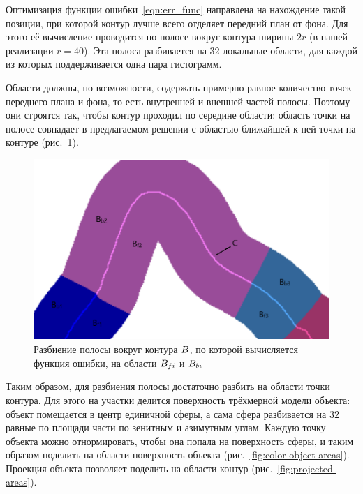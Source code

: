 Оптимизация функции ошибки~\ref{eqn:err_func} направлена на нахождение такой
позиции, при которой контур лучше всего отделяет передний план от фона.
Для этого её вычисление проводится по полосе вокруг контура ширины $2r$ (в нашей
реализации $r = 40$).
Эта полоса разбивается на $32$ локальные области, для каждой из
которых поддерживается одна пара гистограмм.

Области должны, по возможности, содержать примерно равное количество точек
переднего плана и фона, то есть внутренней и внешней частей полосы.
Поэтому они строятся так, чтобы контур проходил по середине области: область
точки на полосе совпадает в предлагаемом решении с областью ближайшей
к ней точки на контуре (рис.~\ref{fig:fb_contour}).

\begin{figure}[t]
    \centering
    \includegraphics[width=\textwidth]{fig/fb_contour.png}
    \caption{
        Разбиение полосы вокруг контура $B$, по которой вычисляется
        функция ошибки, на области $B_{fi}$ и $B_{bi}$
    }
    \label{fig:fb_contour}
\end{figure}

Таким образом, для разбиения полосы достаточно разбить на области точки контура.
Для этого на участки делится поверхность трёхмерной модели объекта: объект
помещается в центр единичной сферы, а сама сфера разбивается на $32$ равные по
площади части по зенитным и азимутным углам.
Каждую точку объекта можно отнормировать, чтобы она попала на поверхность
сферы, и таким образом поделить на области поверхность объекта
(рис.~\ref{fig:color-object-areas}).
Проекция объекта позволяет поделить на области контур
(рис.~\ref{fig:projected-areas}).

